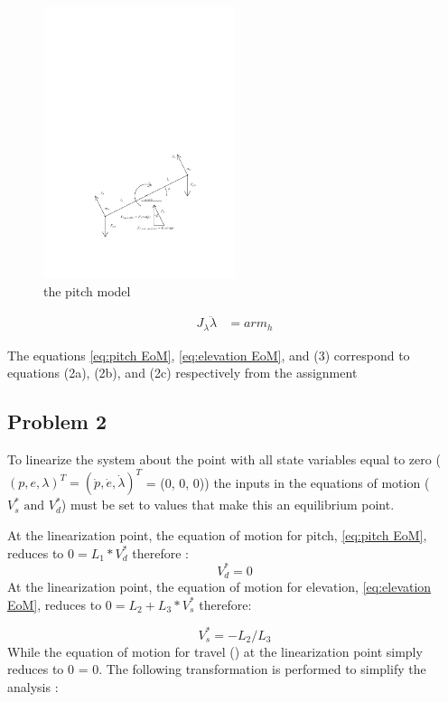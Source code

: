 \begin{figure}[H]
  \caption{the pitch model}
  \label{fig:pitch_model}
  \includegraphics[width=0.5\textwidth]{images/pitch_model}
\end{figure}

\begin{align*}
\label{eq:lambda EoM}
  J_\lambda\ddot{\lambda} &= arm_h
\end{align*}

The equations \cref{eq:pitch EoM}, \ref{eq:elevation EoM}, and (3) correspond to equations (2a), (2b), and (2c) respectively from the assignment \cite[p.13]{assignment}

\subsection{Problem 2}
To linearize the system about the point with all state variables equal
to zero ($(p, e, \lambda)^T = (\dot{p},\dot{e},\dot{\lambda})^T $ = (0, 0, 0))
the inputs in the equations of motion ($V^{*}_{s} \text{ and } V^{*}_{d}$) must be set to
values that make this an equilibrium point.

At the linearization point, the equation of motion for pitch,
\cref{eq:pitch EoM}, reduces to $0 = L_{1} *
V^{*}_{d}$ therefore
:
\begin{equation}
\label{eq:V^*_d value}
  V^{*}_{d} = 0
\end{equation}
At the linearization point, the equation of motion for elevation,
\cref{eq:elevation EoM}, reduces to $0 = L_{2} +
L_{3}*V^{*}_{s}$ therefore:

\begin{equation}
\label{eq:V^*_s value}
  V^{*}_{s} = -L_{2} / L_{3}
\end{equation}
While the equation of motion for travel () at the linearization point simply reduces to 0 = 0.
The following transformation is performed to simplify the analysis
\cite[p.14]{assignment}:

